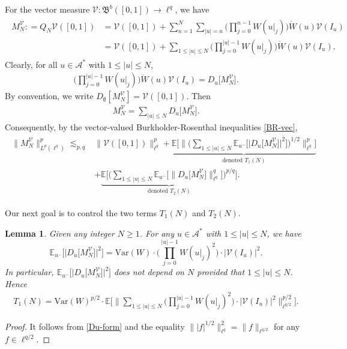 \documentclass[12pt]{amsart}
\newtheorem{lemma}[theorem]{Lemma}
\theoremstyle{definition}
\theoremstyle{remark}
\newcommand{\E}{\mathbb{E}}
\newcommand{\Var}{\mathrm{Var}}
\newcommand{\Ab}{\mathcal{A}}
\numberwithin{equation}{section}
\begin{document}
For the vector measure $\mathcal{V}: \mathfrak{B}^b([0,1])\rightarrow \ell^q$,  we have 
\begin{align}\label{def-MNV}
\begin{split}
M_N^\mathcal{V}: = Q_N\mathcal{V}([0,1]) & =       \mathcal{V}([0,1]) + \sum_{n=1}^N  \sum_{|u|=n}  \Big(  \prod_{j=0}^{n-1} W(u|_j) \Big) \mathring{W}(u) \mathcal{V}(I_u)
\\
&  =  \mathcal{V}([0,1]) + \sum_{1\le |u|\le N}  \Big(  \prod_{j=0}^{|u|-1} W(u|_j) \Big) \mathring{W}(u) \mathcal{V}(I_u). 
\end{split}
\end{align}
Clearly,  for all $u\in \Ab^*$ with $1\le |u|\le N$, 
\begin{align}\label{Du-form}
\Big(  \prod_{j=0}^{|u|-1} W(u|_j) \Big) \mathring{W}(u) \mathcal{V}(I_u) = D_u \big[ M_N^\mathcal{V}\big]. 
 \end{align}
 By convention, we write $D_\emptyset [M_N^\mathcal{V}] = \mathcal{V}([0,1])$. Then 
 \begin{align}\label{MN-diff}
 M_N^\mathcal{V} = \sum_{|u|\le N} D_u\big[M_N^\mathcal{V}\big]. 
 \end{align}
Consequently, by  the vector-valued Burkholder-Rosenthal inequalities \eqref{BR-vec}, 
\begin{align}\label{MnV-norm}
\begin{split}
\| M_N^\mathcal{V}\|_{L^p(\ell^q)}^p \lesssim_{p,q} &  \|\mathcal{V}([0,1]) \|_{\ell^q}^p +   \underbrace{ \E\Big[ \Big\|\Big(\sum_{1\le |u|\le N}\E_{u^{-}}\big[\big|D_u \big[ M_N^\mathcal{V}\big]\big|^2\big]\Big)^{1/2}\Big\|_{\ell^q}^p \Big]}_{\text{denoted $T_1(N)$}} 
\\
& +   \underbrace{\E\Big[\Big(\sum_{1\le |u|\le N}\E_{u^{-}}\big[\big\|  D_u \big[ M_N^\mathcal{V}\big] \big \|_{\ell^q}^q\big]\Big)^{p/q}\Big]}_{\text{denoted $T_2(N)$}}.
\end{split}
\end{align}



Our next goal is to  control  the two terms $T_1(N)$ and $T_2(N)$. 

\begin{lemma}\label{lem-I}
Given any integer $N\ge 1$. For any $u\in \Ab^*$ with $1\le |u|\le N$, we have 
\[
\E_{u^{-}}\Big[\big|D_u \big[ M_N^\mathcal{V}\big]\big|^2\Big] =\Var(W)  \cdot \Big(  \prod_{j=0}^{|u|-1} W(u|_j)^2 \Big)   \cdot  \big| \mathcal{V}(I_u)  \big|^2. 
\]
In particular, $\E_{u^{-}}\big[\big|D_u \big[ M_N^\mathcal{V}\big]\big|^2\big]$ does not depend on $N$ provided that $1\le |u|\le N$. Hence  
\begin{align*}
 T_1 (N)=    \Var(W)^{p/2} 
 \cdot  \E\Big[ \Big\| \sum_{1\le |u|\le N}    \Big(  \prod_{j=0}^{|u|-1} W(u|_j)^2 \Big)   \cdot  \big| \mathcal{V}(I_u)  \big|^2       \Big\|_{\ell^{q/2}}^{p/2} \Big]. 
\end{align*}
\end{lemma}
\begin{proof}
It follows from \eqref{Du-form} and  the equality $\| |f|^{1/2}\|_{\ell^q}^2   = \|  f\|_{\ell^{q/2}}$ for any $f\in \ell^{q/2}$. 
\end{proof}
\end{document}
